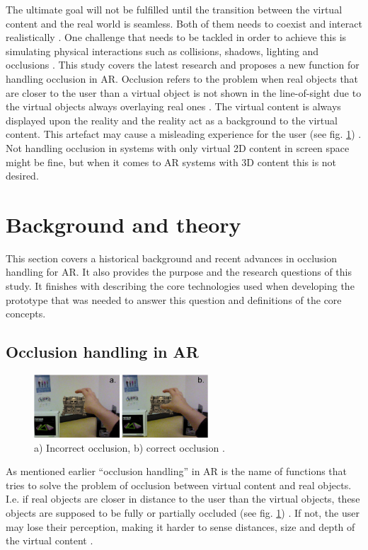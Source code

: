 The ultimate goal will not be fulfilled until the transition between the virtual content and the real world is seamless. Both of them needs to coexist and interact realistically \cite{breen1996interactive}. One challenge that needs to be tackled in order to achieve this is simulating physical interactions such as collisions, shadows, lighting and occlusions \cite{fortin2006handling}.
This study covers the latest research and proposes a new function for handling occlusion in AR. Occlusion refers to the problem when real objects that are closer to the user than a virtual object is not shown in the line-of-sight due to the virtual objects always overlaying real ones \cite{breen1996interactive}. The virtual content is always displayed upon the reality and the reality act as a background to the virtual content. This artefact may cause a misleading experience for the user (see fig. \ref{fig:_image_occlusion-example}) \cite{shah2012occlusion}. Not handling occlusion in systems with only virtual 2D content in screen space might be fine, but when it comes to AR systems with 3D content this is not desired. 

\section{Background and theory}
This section covers a historical background and recent advances in occlusion handling for AR. It also provides the purpose and the research questions of this study. It finishes with describing the core technologies used when developing the prototype that was needed to answer this question and definitions of the core concepts.
\subsection{Occlusion handling in AR}
\begin{figure}
\includegraphics[width=246.666px, height=89.333px]{_image_occlusion-example}
\caption{a) Incorrect occlusion, b) correct occlusion \cite{du2016edge}.}
\label{fig:_image_occlusion-example}
\end{figure}

As mentioned earlier ``occlusion handling'' in AR is the name of functions that tries to solve the problem of occlusion between virtual content and real objects. I.e. if real objects are closer in distance to the user than the virtual objects, these objects are supposed to be fully or partially occluded (see fig. \ref{fig:_image_occlusion-example}) . If not, the user may lose their perception, making it harder to sense distances, size and depth of the virtual content \cite{shah2012occlusion}.

